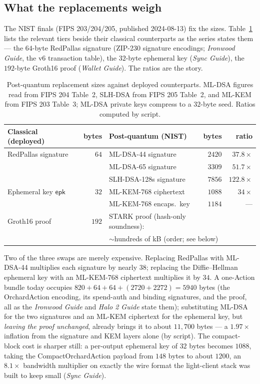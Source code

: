 \documentclass[11pt,a4paper]{article}
\theoremstyle{definition}
\begin{document}
\subsection{What the replacements weigh}\label{sec:pq-sizes}

The NIST finals (FIPS 203/204/205, published 2024-08-13) fix the sizes.
Table~\ref{tab:pq-nist} lists the relevant tiers beside their classical
counterparts as the series states them --- the $64$-byte RedPallas
signature (ZIP-230 signature encodings; \emph{Ironwood Guide}, the v6
transaction table), the $32$-byte ephemeral key (\emph{Sync Guide}),
the $192$-byte Groth16 proof (\emph{Wallet Guide}). The ratios are the
story.

\begin{table}[ht]
\centering
\small
\begin{tabular}{@{}l r l r r@{}}
\toprule
Classical (deployed) & bytes & Post-quantum (NIST) & bytes & ratio \\
\midrule
RedPallas signature & $64$ & ML-DSA-44 signature & $2420$ & $37.8\times$ \\
                    &      & ML-DSA-65 signature & $3309$ & $51.7\times$ \\
                    &      & SLH-DSA-128s signature & $7856$ & $122.8\times$ \\
\addlinespace[2pt]
Ephemeral key $\mathsf{epk}$ & $32$ & ML-KEM-768 ciphertext & $1088$ & $34\times$ \\
                             &      & ML-KEM-768 encaps.\ key & $1184$ & --- \\
\addlinespace[2pt]
Groth16 proof & $192$ & \multicolumn{2}{l}{STARK proof (hash-only soundness):} & \\
              &       & \multicolumn{3}{l}{$\sim$hundreds of kB (order; see below)} \\
\bottomrule
\end{tabular}
\caption{Post-quantum replacement sizes against deployed counterparts.
ML-DSA figures read from FIPS 204 Table~2, SLH-DSA from FIPS 205
Table~2, and ML-KEM from FIPS 203 Table~3; ML-DSA private keys compress
to a $32$-byte seed. Ratios computed by script.}
\label{tab:pq-nist}
\end{table}

Two of the three swaps are merely expensive. Replacing RedPallas with
ML-DSA-44 multiplies each signature by nearly $38$; replacing the
Diffie--Hellman ephemeral key with an ML-KEM-768 ciphertext multiplies
it by $34$. A one-Action bundle today occupies
$820 + 64 + 64 + (2720 + 2272) = 5940$ bytes (the OrchardAction
encoding, its spend-auth and binding signatures, and the proof, all as
the \emph{Ironwood Guide} and \emph{Halo 2 Guide} state them);
substituting ML-DSA for the two signatures and an ML-KEM ciphertext for
the ephemeral key, but \emph{leaving the proof unchanged}, already
brings it to about $11{,}700$ bytes --- a $1.97\times$ inflation from
the signature and KEM layers alone (by script). The compact-block cost
is sharper still: a per-output ephemeral key of $32$ bytes becomes
$1088$, taking the \textsf{CompactOrchardAction} payload from $148$
bytes to about $1200$, an $8.1\times$ bandwidth multiplier on exactly
the wire format the light-client stack was built to keep small
(\emph{Sync Guide}).
\end{document}
